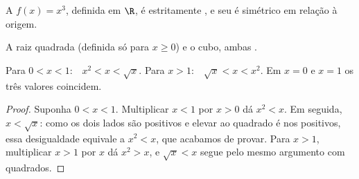 \begin{proposition}\label{prop:g10:reffunc:cube}
A  $f(x) = x^3$, definida em $\R$, é estritamente , e seu
 é simétrico em relação à origem.
\end{proposition}
\admitted

\begin{omfigure}
\hfill
{}

{\small A raiz quadrada (definida só para $x \geq 0$) e o cubo, ambas
.}
\end{omfigure}

\begin{proposition}\label{prop:g10:reffunc:compare}
Para $0 < x < 1$:\ \ $x^2 < x < \sqrt x$.\quad
Para $x > 1$:\ \ $\sqrt x < x < x^2$.\quad
Em $x = 0$ e $x = 1$ os três valores coincidem.
\end{proposition}

\begin{proof}
Suponha $0 < x < 1$. Multiplicar $x < 1$ por $x > 0$ dá $x^2 < x$. Em
seguida, $x < \sqrt x$: como os dois lados são positivos e elevar ao
quadrado é  nos positivos, essa desigualdade equivale a
$x^2 < x$, que acabamos de provar. Para $x > 1$, multiplicar $x > 1$ por
$x$ dá $x^2 > x$, e $\sqrt x < x$ segue pelo mesmo argumento com
quadrados.
\end{proof}

